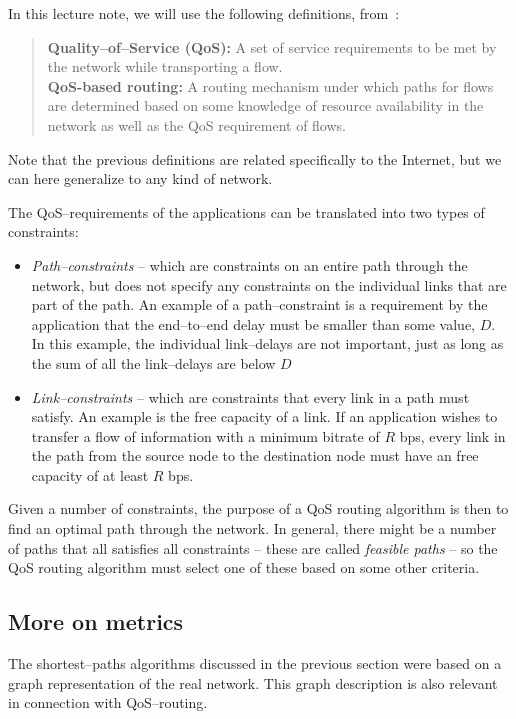 \documentclass[a4paper]{article}
\begin{document}
In this lecture note, we will use the following definitions, from~\cite{ref:rfc2386}:
\begin{quote}
\textbf{Quality--of--Service (QoS):} A set of service requirements
to be met by the network while transporting a flow.\\
\textbf{QoS-based routing:} A routing mechanism under which paths
for flows are determined based on some knowledge of resource
availability in the network as well as the QoS requirement of
flows.
\end{quote}

Note that the previous definitions are related specifically to the
Internet, but we can here generalize to any kind of network.

The QoS--requirements of the applications can be translated into
two types of constraints:\begin{itemize}
%
\item \emph{Path--constraints} -- which are constraints on an
entire path through the network, but does not specify any
constraints on the individual links that are part of the path. An
example of a path--constraint is a requirement by the application
that the end--to--end delay must be smaller than some value, $D$.
In this example, the individual link--delays are not important,
just as long as the sum of all the link--delays are below $D$
%
\item \emph{Link--constraints} --  which are constraints that
every link in a path must satisfy. An example is the free
capacity of a link. If an application wishes to transfer a flow of
information with a minimum bitrate of $R$ bps, every link in the
path from the source node to the destination node must have an
free capacity of at least $R$ bps.
%
\end{itemize}

Given a number of constraints, the purpose of a QoS routing
algorithm is then to find an optimal path through the network. In
general, there might be a number of paths that all satisfies all
constraints -- these are called \emph{feasible paths} -- so the
QoS routing algorithm must select one of these based on some other
criteria.

\subsection{More on metrics}
The shortest--paths algorithms discussed in the previous section
were based on a graph representation of the real network. This
graph description is also relevant in connection with QoS--routing.
\end{document}

